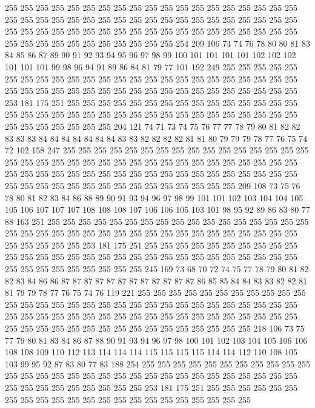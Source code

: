 255 255 255 255 255 255 255 255 255 255 255 255 255 255 255 255 255 255 255 255
255 255 255 255 255 255 255 255 255 255 255 255 255 255 255 255 255 255 255 255
255 255 255 255 255 255 255 255 255 255 255 255 255 255 255 255 255 255 255 255
255 255 255 255 255 255 255 255 254 209 106 74 74 76 78 80 80 81 83 84
85 86 87 89 90 91 92 93 94 95 96 97 98 99 100 101 101 101 101 102
102 102 101 101 101 99 98 96 94 91 89 86 84 81 79 77 101 192 249 255
255 255 255 255 255 255 255 255 255 255 255 255 255 255 255 255 255 255 255 255
255 255 255 255 255 255 255 255 255 255 255 255 255 255 255 255 255 255 255 255
255 255 253 181 175 251 255 255 255 255 255 255 255 255 255 255 255 255 255 255
255 255 255 255 255 255 255 255 255 255 255 255 255 255 255 255 255 255 255 255
255 255 255 255 255 255 255 204 121 74 71 73 74 75 76 77 77 78 79 80
81 82 82 83 83 83 84 84 84 84 84 84 84 83 83 82 82 82 82 81
81 80 79 79 79 78 77 76 75 74 72 102 158 247 255 255 255 255 255 255
255 255 255 255 255 255 255 255 255 255 255 255 255 255 255 255 255 255 255 255
255 255 255 255 255 255 255 255 255 255 255 255 255 255 255 255 255 255 255 255
255 255 255 255 255 255 255 255 255 255 255 255 255 255 255 255 255 255 255 255
255 255 255 209 108 73 75 76 78 80 81 82 83 84 86 88 89 90 91 93
94 96 97 98 99 101 101 102 103 104 104 105 105 106 107 107 107 108 108 108
107 106 106 105 103 101 98 95 92 89 86 83 80 77 88 163 251 255 255 255
255 255 255 255 255 255 255 255 255 255 255 255 255 255 255 255 255 255 255 255
255 255 255 255 255 255 255 255 255 255 255 255 255 255 255 255 255 255 253 181
175 251 255 255 255 255 255 255 255 255 255 255 255 255 255 255 255 255 255 255
255 255 255 255 255 255 255 255 255 255 255 255 255 255 255 255 255 255 255 255
245 169 73 68 70 72 74 75 77 78 79 80 81 82 82 83 84 86 86 87
87 87 87 87 87 87 87 87 87 87 87 86 85 85 84 84 83 83 82 82
81 81 79 79 78 77 76 75 74 76 119 221 255 255 255 255 255 255 255 255
255 255 255 255 255 255 255 255 255 255 255 255 255 255 255 255 255 255 255 255
255 255 255 255 255 255 255 255 255 255 255 255 255 255 255 255 255 255 255 255
255 255 255 255 255 255 255 255 255 255 255 255 255 255 255 255 255 218 106 73
75 77 79 80 81 83 84 86 87 88 90 91 93 94 96 97 98 100 101 102
103 104 105 106 106 108 108 109 110 112 113 114 114 114 115 115 115 115 114 114
112 110 108 105 103 99 95 92 87 83 80 77 83 188 254 255 255 255 255 255
255 255 255 255 255 255 255 255 255 255 255 255 255 255 255 255 255 255 255 255
255 255 255 255 255 255 255 255 255 255 255 255 255 255 253 181 175 251 255 255
255 255 255 255 255 255 255 255 255 255 255 255 255 255 255 255 255 255 255 255

